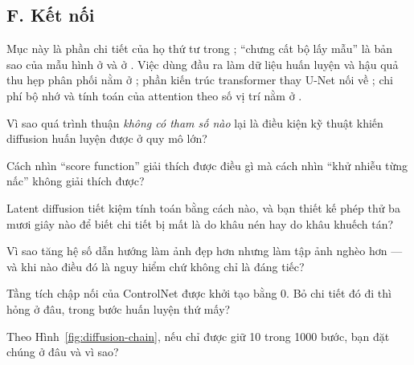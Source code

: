 \documentclass[../../../deep_learning.tex]{subfiles}
\begin{document}
\subsection{F. Kết nối}
Mục này là phần chi tiết của họ thứ tư trong ; ``chưng cất bộ lấy mẫu'' là bản sao của mẫu hình ở  và ở . Việc dùng đầu ra làm dữ liệu huấn luyện và hậu quả thu hẹp phân phối nằm ở ; phần kiến trúc transformer thay U-Net nối về ; chi phí bộ nhớ và tính toán của attention theo số vị trí nằm ở .

\begin{tukiem}
\item Vì sao quá trình thuận \emph{không có tham số nào} lại là điều kiện kỹ thuật khiến diffusion huấn luyện được ở quy mô lớn?
\item Cách nhìn ``score function'' giải thích được điều gì mà cách nhìn ``khử nhiễu từng nấc'' không giải thích được?
\item Latent diffusion tiết kiệm tính toán bằng cách nào, và bạn thiết kế phép thử ba mươi giây nào để biết chi tiết bị mất là do khâu nén hay do khâu khuếch tán?
\item Vì sao tăng hệ số dẫn hướng làm ảnh đẹp hơn nhưng làm tập ảnh nghèo hơn --- và khi nào điều đó là nguy hiểm chứ không chỉ là đáng tiếc?
\item Tầng tích chập nối của ControlNet được khởi tạo bằng 0. Bỏ chi tiết đó đi thì hỏng ở đâu, trong bước huấn luyện thứ mấy?
\item Theo Hình~\ref{fig:diffusion-chain}, nếu chỉ được giữ 10 trong 1000 bước, bạn đặt chúng ở đâu và vì sao?
\end{tukiem}
\ifSubfilesClassLoaded{\printbibliography[title={Nguồn}]}{}
\end{document}
